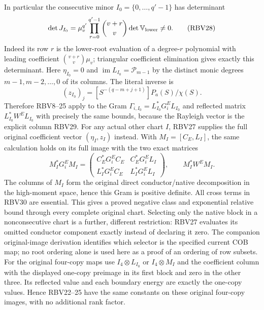 In particular the consecutive minor
$I_0=\{0,\ldots,q'-1\}$ has determinant
\[
\det J_{I_0}=\mu_v^{q'}
 \prod_{r=0}^{q'-1}\binom{v+r}{v}\det\mathbb V_{\rm lower}\ne0.
\tag{RBV28}
\]
Indeed its row $r$ is the lower-root evaluation of a degree-$r$
polynomial with leading coefficient $\binom{v+r}{v}\mu_v$;
triangular coefficient elimination gives exactly this determinant.
Here $\eta_{I_0}=0$ and
$\operatorname{im}L_{I_0}=\mathcal P_{m-1}$ by the distinct monic
degrees $m-1,m-2,\ldots,0$ of its columns. The literal inverse is
\[
(z_{I_0})_j=[S^{-(q-m+j+1)}]P_a(S)/\chi(S).
\tag{RBV29}
\]
Therefore RBV8--25 apply to the Gram
$\Gamma_{i,I_0}=L_{I_0}^*G_i^EL_{I_0}$ and reflected matrix
$L_{I_0}^*W^EL_{I_0}$ with precisely the same bounds, because the
Rayleigh vector is the explicit column RBV29. For any actual other
chart $I$, RBV27 supplies the full original coefficient vector
$(\eta_I,z_I)$ instead. With $M_I=[C_E,L_I]$, the same calculation
holds on its full image with the two exact matrices
\[
M_I^*G_i^EM_I=\begin{pmatrix}
C_E^*G_i^EC_E&C_E^*G_i^EL_I\\
L_I^*G_i^EC_E&L_I^*G_i^EL_I
\end{pmatrix},\qquad M_I^*W^EM_I.
\tag{RBV30}
\]
The columns of $M_I$ form the original direct conductor/native
decomposition in the high-moment space, hence this Gram is positive
definite. All cross terms in RBV30 are essential.
This gives a proved negative class and exponential relative bound
through every complete original chart. Selecting only the native
block in a nonconsecutive chart is a further, different restriction:
RBV27 evaluates its omitted conductor component exactly instead of
declaring it zero. The companion original-image derivation identifies
which selector is the specified current COB map; no root ordering
alone is used here as a proof of an ordering of row subsets.
For the original four-copy maps use $I_4\otimes L_{I_0}$ or
$I_4\otimes M_I$ and the coefficient column with the displayed
one-copy preimage in its first block and zero in the other three.
Its reflected value and each boundary energy are exactly the
one-copy values. Hence RBV22--25 have the same constants on these
original four-copy images, with no additional rank factor.

